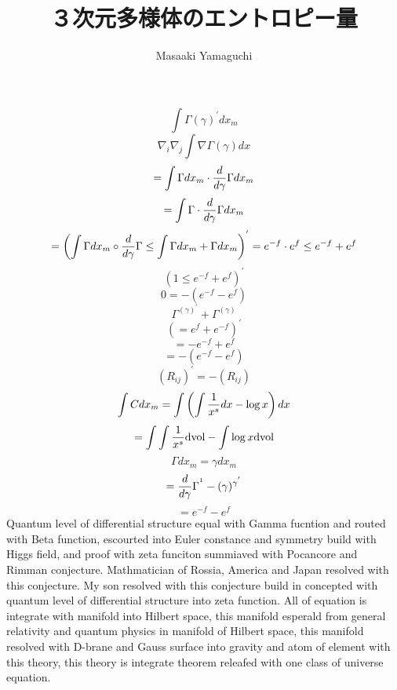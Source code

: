 \documentclass{jsarticle}
\begin{document}
{  $$ \int \Gamma(\gamma)^{'}dx_m $$
  $$ \nabla_i \nabla_j \int \nabla \Gamma(\gamma)dx $$
  $$ = \int \Gamma dx_m \cdot {d \over d \gamma}\Gamma dx_m $$
  $$ = \int \Gamma \cdot {d \over d \gamma}\Gamma dx_m $$
  $$ = \left(\int \Gamma dx_m \circ {d \over d\gamma}\Gamma \le
  \int \Gamma dx_m + \Gamma dx_m \right)^{'} 
  = e^{-f} \cdot e^{f} \le e^{-f} + e^{f} $$
  $$ \left(1 \le e^{-f} + e^{f}\right)^{'} $$
  $$ 0 = -(e^{-f} - e^{f}) $$
  $$ \Gamma^{(\gamma)^{'}} + \Gamma^{(\gamma)} $$
  $$ (= e^f + e^{-f})^{'} $$
  $$ = - e^{-f} + e^{f} $$
  $$ = - (e^{-f} - e^f) $$
  $$ (R_{ij})^{'} = - (R_{ij}) $$
  $$ \int C dx_m = \int\left(\int{1 \over x^s}dx - \log x \right)dx $$
  $$ = \int \int{1 \over x^s}\mathrm{dvol} - \int \log x \mathrm{dvol} $$
  $$ \Gamma dx_m = \gamma dx_m $$
  $$ = {d \over d \gamma}\Gamma^{^1} - (\gamma)^{\gamma^{'}} $$
  $$ = e^{-f} - e^{f} $$
  Quantum level of differential structure equal with Gamma fucntion and
  routed with Beta function, escourted into Euler constance and symmetry 
  build with Higgs field, and proof with zeta funciton summiaved with 
  Pocancore and Rimman conjecture.
  Mathmatician of Rossia, America and Japan resolved with this conjecture.
  My son resolved with this conjecture build in concepted with quantum
  level of differential structure into zeta function.
  All of equation is integrate with manifold into Hilbert space,
  this manifold esperald from general relativity and quantum physics
  in manifold of Hilbert space, this manifold resolved with D-brane
  and Gauss surface into gravity and atom of element with this theory,
  this theory is integrate theorem releafed with one class of universe 
  equation.

\newpage
\title{３次元多様体のエントロピー量}
\author{Masaaki Yamaguchi}

}
\end{document}
